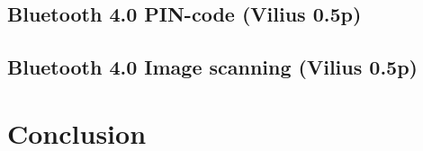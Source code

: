 \documentclass[12pt]{article}
\begin{document}
\subsection{Bluetooth 4.0 PIN-code (Vilius 0.5p)}
\label{sub:Bluetooth 4.0 PIN-code}

\subsection{Bluetooth 4.0 Image scanning (Vilius 0.5p)}
\label{sub:Bluetooth 4.0 Image scanning}

\newpage

\section{Conclusion}
\label{sec:Conclusion}

\newpage


\nocite{*}

\end{document}
